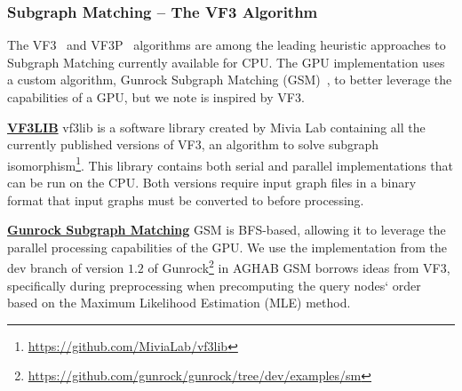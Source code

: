 \subsubsection{Subgraph Matching -- The VF3 Algorithm}
    The VF3~\cite{Carletti2017} and VF3P~\cite{Carletti2019} algorithms are among the leading heuristic approaches to Subgraph Matching currently available for CPU. 
    The GPU implementation uses a custom algorithm, Gunrock Subgraph Matching (GSM)~\cite{Wang2016}, to better leverage the capabilities of a GPU, but we note is inspired by VF3.

    \underline{\textbf{VF3LIB}}
        vf3lib is a software library created by Mivia Lab containing all the currently published versions of VF3, an algorithm to solve subgraph isomorphism\footnote{\url{https://github.com/MiviaLab/vf3lib}}. 
        This library contains both serial and parallel implementations that can be run on the CPU. 
        Both versions require input graph files in a binary format that input graphs must be converted to before processing.

    \underline{\textbf{Gunrock Subgraph Matching}}
        GSM is BFS-based, allowing it to leverage the parallel processing capabilities of the GPU.
        We use the implementation from the dev branch of version $1.2$ of Gunrock\footnote{\url{https://github.com/gunrock/gunrock/tree/dev/examples/sm}} in AGHAB 
        GSM borrows ideas from VF3, specifically during preprocessing when precomputing the query nodes` order based on the Maximum Likelihood Estimation (MLE) method. 
    